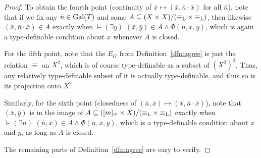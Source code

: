 \begin{proof}
		To obtain the fourth point (continuity of $\bar x\mapsto (\bar x,\bar n\cdot \bar x)$ for all $\bar n$), note that if we fix any $\bar n\in \operatorname{{Gal}}(T)$ and some $A\subseteq (X\times X)/({\equiv_{\mathrm{L}}}\times {\equiv_{\mathrm{L}}})$, then likewise $(\bar x,\bar n\cdot \bar x)\in A$ exactly when $\models(\exists y)\,\, (\bar x,\bar y)\in A\land \Phi(n,x,y)$, which is again a type-definable condition about $x$ whenever $A$ is closed.
		
		For the fifth point, note that the $E_G$ from Definition~\ref{dfn:agree} is just the relation $\equiv$ on $X^2$, which is of course type-definable as a subset of $(X^2)^2$. Thus, any relatively type-definable subset of it is actually type-definable, and thus so is its projection onto $X^2$.
		
		Similarly, for the sixth point (closedness of $(\bar n,\bar x)\mapsto (\bar x,\bar n\cdot \bar x)$), note that $(\bar x,\bar y)$ is in the image of $A\subseteq ([m]_{\equiv}\times X)/({\equiv_{\mathrm{L}}}\times {\equiv_{\mathrm{L}}})$ exactly when $\models (\exists n)\,\, (\bar n,\bar x)\in A\land \Phi(n,x,y)$, which is a type-definable condition about $x$ and $y$, as long as $A$ is closed.
		
		The remaining parts of Definition~\ref{dfn:agree} are easy to verify.
	\end{proof}
	
